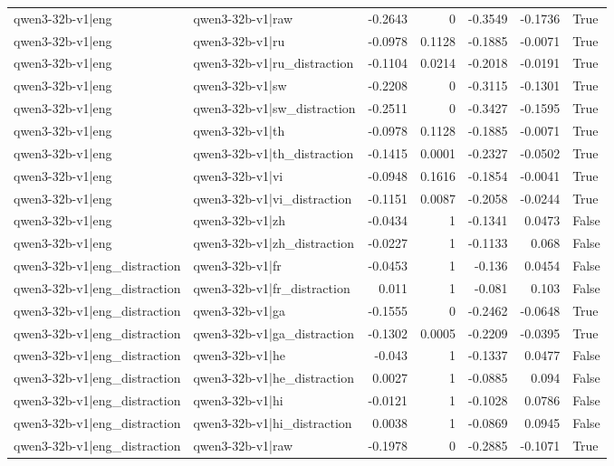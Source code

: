 \begin{table}
\begin{tabular}{l l r r r r l}
qwen3-32b-v1|eng & qwen3-32b-v1|raw & -0.2643 & 0 & -0.3549 & -0.1736 & True \\
qwen3-32b-v1|eng & qwen3-32b-v1|ru & -0.0978 & 0.1128 & -0.1885 & -0.0071 & True \\
qwen3-32b-v1|eng & qwen3-32b-v1|ru_distraction & -0.1104 & 0.0214 & -0.2018 & -0.0191 & True \\
qwen3-32b-v1|eng & qwen3-32b-v1|sw & -0.2208 & 0 & -0.3115 & -0.1301 & True \\
qwen3-32b-v1|eng & qwen3-32b-v1|sw_distraction & -0.2511 & 0 & -0.3427 & -0.1595 & True \\
qwen3-32b-v1|eng & qwen3-32b-v1|th & -0.0978 & 0.1128 & -0.1885 & -0.0071 & True \\
qwen3-32b-v1|eng & qwen3-32b-v1|th_distraction & -0.1415 & 0.0001 & -0.2327 & -0.0502 & True \\
qwen3-32b-v1|eng & qwen3-32b-v1|vi & -0.0948 & 0.1616 & -0.1854 & -0.0041 & True \\
qwen3-32b-v1|eng & qwen3-32b-v1|vi_distraction & -0.1151 & 0.0087 & -0.2058 & -0.0244 & True \\
qwen3-32b-v1|eng & qwen3-32b-v1|zh & -0.0434 & 1 & -0.1341 & 0.0473 & False \\
qwen3-32b-v1|eng & qwen3-32b-v1|zh_distraction & -0.0227 & 1 & -0.1133 & 0.068 & False \\
qwen3-32b-v1|eng_distraction & qwen3-32b-v1|fr & -0.0453 & 1 & -0.136 & 0.0454 & False \\
qwen3-32b-v1|eng_distraction & qwen3-32b-v1|fr_distraction & 0.011 & 1 & -0.081 & 0.103 & False \\
qwen3-32b-v1|eng_distraction & qwen3-32b-v1|ga & -0.1555 & 0 & -0.2462 & -0.0648 & True \\
qwen3-32b-v1|eng_distraction & qwen3-32b-v1|ga_distraction & -0.1302 & 0.0005 & -0.2209 & -0.0395 & True \\
qwen3-32b-v1|eng_distraction & qwen3-32b-v1|he & -0.043 & 1 & -0.1337 & 0.0477 & False \\
qwen3-32b-v1|eng_distraction & qwen3-32b-v1|he_distraction & 0.0027 & 1 & -0.0885 & 0.094 & False \\
qwen3-32b-v1|eng_distraction & qwen3-32b-v1|hi & -0.0121 & 1 & -0.1028 & 0.0786 & False \\
qwen3-32b-v1|eng_distraction & qwen3-32b-v1|hi_distraction & 0.0038 & 1 & -0.0869 & 0.0945 & False \\
qwen3-32b-v1|eng_distraction & qwen3-32b-v1|raw & -0.1978 & 0 & -0.2885 & -0.1071 & True \\

\end{tabular}
\end{table}
